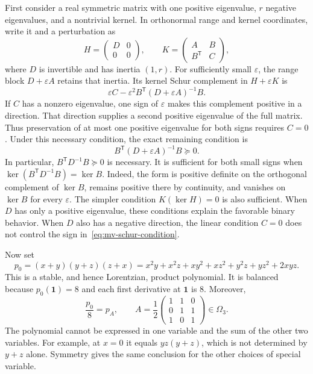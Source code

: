 \documentclass[11pt,a4paper]{article}
\theoremstyle{definition}
\theoremstyle{remark}
\newcommand{\T}{\mathsf{T}}
\begin{document}
First consider a real symmetric matrix with one positive eigenvalue, $r$ negative eigenvalues, and a nontrivial kernel.
In orthonormal range and kernel coordinates, write it and a perturbation as
\[
 H=\begin{pmatrix}D&0\\0&0\end{pmatrix},\qquad
 K=\begin{pmatrix}A&B\\B^\T&C\end{pmatrix},
\]
where $D$ is invertible and has inertia $(1,r)$.
For sufficiently small $\varepsilon$, the range block $D+\varepsilon A$ retains that inertia.
Its kernel Schur complement in $H+\varepsilon K$ is
\[
 \varepsilon C-\varepsilon^2B^\T(D+\varepsilon A)^{-1}B.
\]
If $C$ has a nonzero eigenvalue, one sign of $\varepsilon$ makes this complement positive in a direction.
That direction supplies a second positive eigenvalue of the full matrix.
Thus preservation of at most one positive eigenvalue for both signs requires $C=0$.
Under this necessary condition, the exact remaining condition is
\begin{equation}\label{eq:mv-schur-condition}
 B^\T(D+\varepsilon A)^{-1}B\succeq0.
\end{equation}
In particular, $B^\T D^{-1}B\succeq0$ is necessary.
It is sufficient for both small signs when
$\ker(B^\T D^{-1}B)=\ker B$.
Indeed, the form is positive definite on the orthogonal complement of $\ker B$, remains positive there by continuity, and vanishes on $\ker B$ for every $\varepsilon$.
The simpler condition $K(\ker H)=0$ is also sufficient.
When $D$ has only a positive eigenvalue, these conditions explain the favorable binary behavior.
When $D$ also has a negative direction, the linear condition $C=0$ does not control the sign in~\eqref{eq:mv-schur-condition}.

Now set
\[
 p_0=(x+y)(y+z)(z+x)
 =x^2y+x^2z+xy^2+xz^2+y^2z+yz^2+2xyz.
\]
This is a stable, and hence Lorentzian, product polynomial.
It is balanced because $p_0(\mathbf1)=8$ and each first derivative at $\mathbf1$ is $8$.
Moreover,
\[
 \frac{p_0}{8}=p_A,\qquad
 A=\frac12\begin{pmatrix}1&1&0\\0&1&1\\1&0&1\end{pmatrix}\in\Omega_3.
\]
The polynomial cannot be expressed in one variable and the sum of the other two variables.
For example, at $x=0$ it equals $yz(y+z)$, which is not determined by $y+z$ alone.
Symmetry gives the same conclusion for the other choices of special variable.
\end{document}
